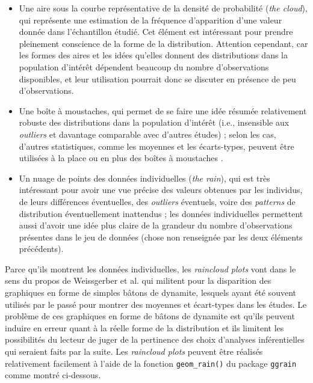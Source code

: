 \documentclass[
]{book}
\providecommand{\tightlist}{%
  \setlength{\itemsep}{0pt}\setlength{\parskip}{0pt}}
\begin{document}
\begin{itemize}
\tightlist
\item
  Une aire sous la courbe représentative de la densité de probabilité (\emph{the cloud}), qui représente une estimation de la fréquence d'apparition d'une valeur donnée dans l'échantillon étudié. Cet élément est intéressant pour prendre pleinement conscience de la forme de la distribution. Attention cependant, car les formes des aires et les idées qu'elles donnent des distributions dans la population d'intérêt dépendent beaucoup du nombre d'observations disponibles, et leur utilisation pourrait donc se discuter en présence de peu d'observations.
\item
  Une boîte à moustaches, qui permet de se faire une idée résumée relativement robuste des distributions dans la population d'intérêt (i.e., insensible aux \emph{outliers} et davantage comparable avec d'autres études) ; selon les cas, d'autres statistiques, comme les moyennes et les écarts-types, peuvent être utilisées à la place ou en plus des boîtes à moustaches \autocite{allenRaincloudPlotsMultiplatform2019}.
\item
  Un nuage de points des données individuelles (\emph{the rain}), qui est très intéressant pour avoir une vue précise des valeurs obtenues par les individus, de leurs différences éventuelles, des \emph{outliers} éventuels, voire des \emph{patterns} de distribution éventuellement inattendus ; les données individuelles permettent aussi d'avoir une idée plus claire de la grandeur du nombre d'observations présentes dans le jeu de données (chose non renseignée par les deux éléments précédents).
\end{itemize}

Parce qu'ils montrent les données individuelles, les \emph{raincloud plots} vont dans le sens du propos de Weissgerber et al. \autocite*{weissgerberBarLineGraphs2015} qui militent pour la disparition des graphiques en forme de simples bâtons de dynamite, lesquels ayant été souvent utilisés par le passé pour montrer des moyennes et écart-types dans les études. Le problème de ces graphiques en forme de bâtons de dynamite est qu'ils peuvent induire en erreur quant à la réelle forme de la distribution et ils limitent les possibilités du lecteur de juger de la pertinence des choix d'analyses inférentielles qui seraient faits par la suite. Les \emph{raincloud plots} peuvent être réalisés relativement facilement à l'aide de la fonction \texttt{geom\_rain()} du package \texttt{ggrain} comme montré ci-dessous.
\end{document}
